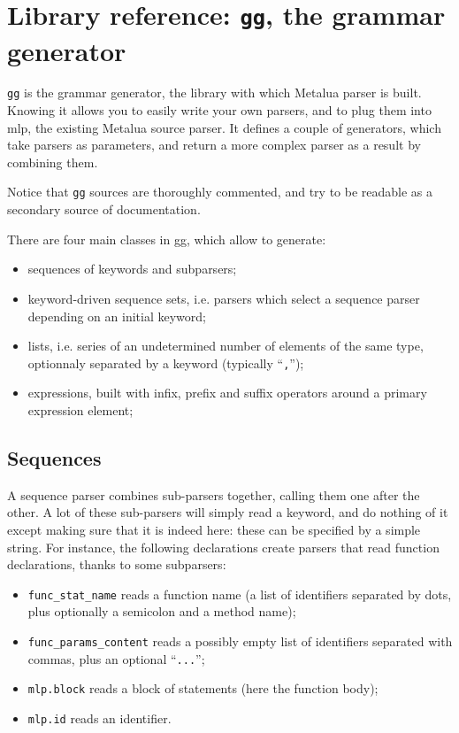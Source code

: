 \section{Library reference: {\tt gg}, the grammar generator}

\verb|gg| is the grammar generator, the library with which Metalua
parser is built. Knowing it allows you to easily write your own
parsers, and to plug them into mlp, the existing Metalua source
parser. It defines a couple of generators, which take parsers as
parameters, and return a more complex parser as a result by combining
them.

Notice that \verb|gg| sources are thoroughly commented, and try to be
readable as a secondary source of documentation.

There are four main classes in gg, which allow to generate:
\begin{itemize}
\item sequences of keywords and subparsers;
\item keyword-driven sequence sets, i.e. parsers which select a
  sequence parser depending on an initial keyword;
\item lists, i.e. series of an undetermined number of elements of the
  same type, optionnaly separated by a keyword (typically ``{\tt,}'');
\item expressions, built with infix, prefix and suffix operators
  around a primary expression element;
\end{itemize}



\subsection{Sequences}

A sequence parser combines sub-parsers together, calling them one after
the other. A lot of these sub-parsers will simply read a keyword, and
do nothing of it except making sure that it is indeed here: these can
be specified by a simple string. For instance, the following
declarations create parsers that read function declarations, thanks
to some subparsers:
\begin{itemize}
\item \verb|func_stat_name| reads a function name (a list of
  identifiers separated by dots, plus optionally a semicolon and a
  method name);
\item \verb|func_params_content| reads a possibly empty list of
  identifiers separated with commas, plus an optional ``\verb|...|'';
\item \verb|mlp.block| reads a block of statements (here the function
  body);
\item \verb|mlp.id| reads an identifier.
\end{itemize}

